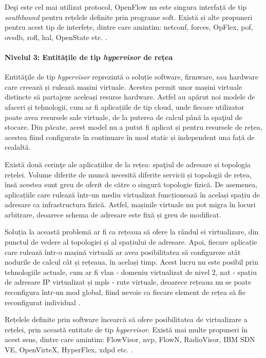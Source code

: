 Deşi este cel mai utilizat protocol, OpenFlow nu este singura interfață de tip \textit{southbound} pentru rețelele definite prin programe soft. Există și alte propuneri pentru acest tip de interfețe, dintre care amintim: \gls{netconf}, \gls{forces}, OpFlex, \gls{pof}, \gls{ovsdb}, \gls{rofl}, \gls{hal}, OpenState etc. \cite{haleplidis2015network, zhou2014research, onfts016}.

\paragraph{Nivelul 3: Entitățile de tip \textit{hypervisor} de rețea}

Entităţile de tip \textit{hypervisor} reprezintă o soluție software, firmware, sau hardware care creează și rulează mașini virtuale. Acestea permit unor mașini virtuale distincte să partajeze aceleași resurse hardware. Astfel au apărut noi modele de afaceri și tehnologii, cum ar fi aplicațiile de tip cloud, unde fiecare utilizator poate avea resursele sale virtuale, de la puterea de calcul până la spaţiul de stocare. Din păcate, acest model nu a putut fi aplicat și pentru resursele de rețea, acestea fiind configurate în continuare în mod static și independent una față de cealaltă.

Există două cerinţe ale aplicațiilor de la rețea: spaţiul de adresare și topologia rețelei. Volume diferite de muncă necesită diferite servicii și topologii de rețea, însă acestea sunt greu de oferit de către o singură topologie fizică. De asemenea, aplicațiile care rulează într-un mediu virtualizat funcționează în același spațiu de adresare ca infrastructura fizică. Astfel, mașinile virtuale nu pot migra în locuri arbitrare, deoarece schema de adresare este fixă și greu de modificat.

Soluția la această problemă ar fi ca rețeaua să ofere la rândul ei virtualizare, din punctul de vedere al topologiei și al spațiului de adresare. Apoi, fiecare aplicație care rulează într-o mașină virtuală ar avea posibilitatea să configureze atât nodurile de calcul cât și rețeaua, în același timp. Acest lucru nu este posibil prin tehnologiile actuale, cum ar fi \gls{vlan} - domeniu virtualizat de nivel 2, \gls{nat} - spațiu de adresare IP virtualizat și \gls{mpls} - rute virtuale, deoarece rețeaua nu se poate reconfigura într-un mod global, fiind nevoie ca fiecare element de rețea să fie reconfigurat individual \cite{kreutz2015software, peng2012vdn, koponen2014network}.

Rețelele definite prin software încearcă să ofere posibilitatea de virtualizare a rețelei, prin această entitate de tip \textit{hypervisor}. Există mai multe propuneri în acest sens, dintre care amintim: FlowVisor, \gls{nvp}, FlowN, RadioVisor, IBM SDN VE, OpenVirteX, HyperFlex, \gls{xdpd} etc. \cite{sherwood2009flowvisor, gudipati2014radiovisor, al2014openvirtex, sune2013xdpd, blenk2015hyperflex}.

